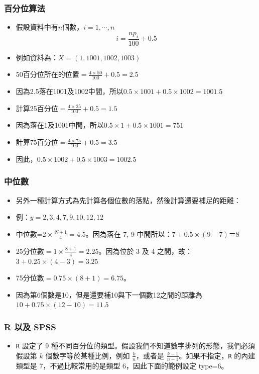 \documentclass{beamer}
\begin{document}
\begin{frame}\frametitle{百分位算法}
\begin{itemize}
\item 假設資料中有$n$個數，$i=1,\cdots,n$\\
\Large
\[i=\frac{np_{i}}{100}+0.5\]
\normalsize
\item 例如資料為：$X=(1, 1001, 1002, 1003)$
\item 50百分位所在的位置$=\frac{4\times 50}{100}+0.5=2.5$
\item 因為2.5落在1001及1002中間，所以$0.5\times 1001+0.5\times 1002=1001.5$
\item 計算25百分位$=\frac{4\times 25}{100}+0.5=1.5$
\item 因為落在1及1001中間，所以$0.5\times 1+0.5\times 1001=751$
\item 計算75百分位$=\frac{4\times 75}{100}+0.5=3.5$
\item 因此，$0.5\times 1002+0.5\times 1003=1002.5$
\end{itemize}
\end{frame}
\begin{frame}\frametitle{中位數}
\begin{itemize}
\item 另外一種計算方式為先計算各個位數的落點，然後計算還要補足的距離：
\item 例：$y=2,3,4,7,9,10,12,12$
\item 中位數=$2\times \frac{N+1}{4}=4.5$。因為落在 7, 9 中間所以：$7+0.5\times (9-7)＝8$
\item 25分位數$=1\times \frac{8+1}{4}=2.25$。因為位於 3 及 4 之間，故：$3+0.25\times (4-3)=3.25$
\item 75分位數$=0.75\times (8+1)=6.75。$ 
\item 因為第6個數是10，但是還要補10與下一個數12之間的距離為$10+0.75\times (12-10)=11.5$
\end{itemize}
\end{frame}
\begin{frame} \frametitle{R 以及 SPSS}
\begin{itemize}
\item \texttt{R} 設定了 9 種不同百分位的類型。假設我們不知道數字排列的形態，我們必須假設第 $k$ 個數字等於某種比例，例如 $\frac{k}{n}$，或者是 $\frac{k-1}{n-1}$。如果不指定，\texttt{R} 的內建類型是 7，不過比較常用的是類型 6，因此下面的範例設定 type=6。
\end{itemize}
\end{frame}
\end{document}
